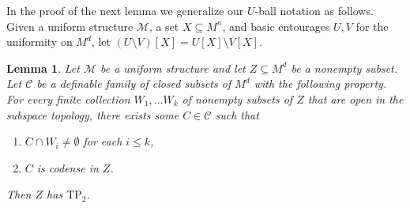 \documentclass[12pt]{article}
\newcommand{\Cc}{\mathcal{C}}
\newcommand{\Mm}{\mathcal{M}}
\newcommand{\TP}{\ensuremath{\mathrm{TP}_2}}
\newtheorem{lemma}[theorem]{Lemma}
\theoremstyle{definition}
\theoremstyle{remark}
\begin{document}
In the proof of the next lemma we generalize our $U$-ball notation as follows. Given a uniform structure $\Mm$, a set $X\subseteq M^n$, and basic entourages $U,V$ for the uniformity on $M^d$, let $(U\setminus V)[X]=U[X]\setminus V[X]$. 

\begin{lemma}\label{lem:noise-NTP2}
Let $\Mm$ be a uniform structure and let $Z\subseteq M^d$ be a nonempty subset. Let $\Cc$ be a definable family of closed subsets of $M^d$ with the following property. For every finite collection $W_1,\ldots W_k$ of nonempty subsets of $Z$ that are open in the subspace topology, there exists some $C\in \Cc$ such that
\begin{enumerate} 
    \item $C \cap W_i\neq \emptyset$ for each $i\leq k$,
    \item $C$ is codense in $Z$. 
\end{enumerate}
Then $Z$ has \TP.
\end{lemma}
\end{document}

